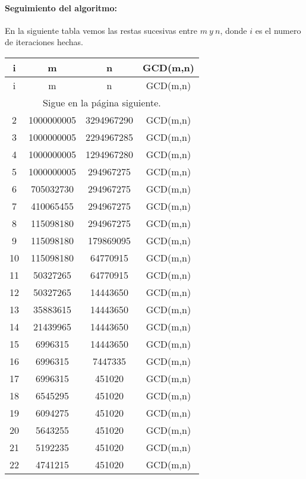 \documentclass[a4paper,10pt]{article}
\begin{document}
\paragraph{Seguimiento del algoritmo:}
En la siguiente tabla vemos las restas sucesivas entre $m\:y\:n$, donde $i$ es el numero de iteraciones hechas.

\begin{longtable}{c|c|c|c}
\hline
i & m & n & GCD(m,n) \\
\hline \hline
\endfirsthead
\hline
i & m & n & GCD(m,n) \\
\hline \hline
\endhead
\multicolumn{4}{c}{Sigue en la página siguiente.}
\endfoot
\endlastfoot
1&4294967295&3294967290&GCD(m,n)\\\hline
2&1000000005&3294967290&GCD(m,n)\\\hline
3&1000000005&2294967285&GCD(m,n)\\\hline
4&1000000005&1294967280&GCD(m,n)\\\hline
5&1000000005&294967275&GCD(m,n)\\\hline
6&705032730&294967275&GCD(m,n)\\\hline
7&410065455&294967275&GCD(m,n)\\\hline
8&115098180&294967275&GCD(m,n)\\\hline
9&115098180&179869095&GCD(m,n)\\\hline
10&115098180&64770915&GCD(m,n)\\\hline
11&50327265&64770915&GCD(m,n)\\\hline
12&50327265&14443650&GCD(m,n)\\\hline
13&35883615&14443650&GCD(m,n)\\\hline
14&21439965&14443650&GCD(m,n)\\\hline
15&6996315&14443650&GCD(m,n)\\\hline
16&6996315&7447335&GCD(m,n)\\\hline
17&6996315&451020&GCD(m,n)\\\hline
18&6545295&451020&GCD(m,n)\\\hline
19&6094275&451020&GCD(m,n)\\\hline
20&5643255&451020&GCD(m,n)\\\hline
21&5192235&451020&GCD(m,n)\\\hline
22&4741215&451020&GCD(m,n)\\\hline

\end{longtable}
\end{document}
